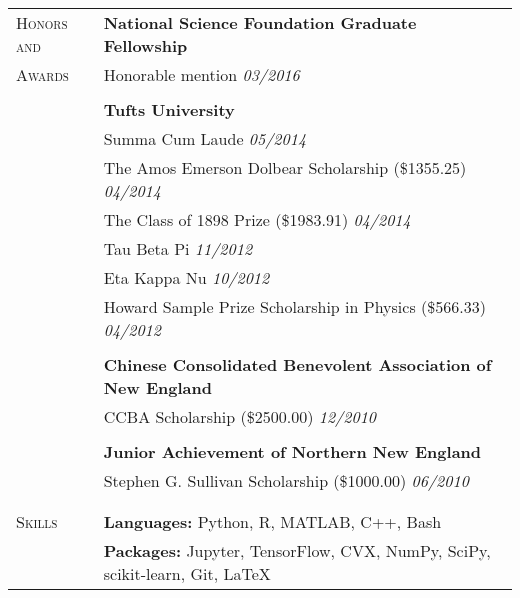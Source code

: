 \documentclass[letterpaper,11pt,oneside]{article}
\begin{document}
\begin{longtable}{@{} p{2.5cm} p{14.8cm}}
 \large{\textsc{Honors and}}  & \textbf{National Science Foundation Graduate Fellowship}   \\*
 \large{\textsc{Awards}} & Honorable mention \hfill \textit{03/2016} \\*
& \\*
& \textbf{Tufts University} \\
& Summa Cum Laude \hfill \textit{05/2014} \\
& The Amos Emerson Dolbear Scholarship (\$1355.25) \hfill \textit{04/2014} \\
& The Class of 1898 Prize (\$1983.91) \hfill \textit{04/2014} \\
& Tau Beta Pi \hfill \textit{11/2012} \\
& Eta Kappa Nu \hfill \textit{10/2012} \\
& Howard Sample Prize Scholarship in Physics (\$566.33) \hfill \textit{04/2012} \\
& \\
& \textbf{Chinese Consolidated Benevolent Association of New England} \\
& CCBA Scholarship (\$2500.00) \hfill \textit{12/2010} \\
& \\
& \textbf{Junior Achievement of Northern New England} \\
& Stephen G. Sullivan Scholarship (\$1000.00) \hfill \textit{06/2010} \\
& \\
& \\
     
  \large{\textsc{Skills}}   & \textbf{Languages:} Python, R, MATLAB, C++, Bash \\
   & \textbf{Packages:} Jupyter, TensorFlow, CVX, NumPy, SciPy, scikit-learn, Git, \LaTeX \\
\end{longtable}
\end{document}
